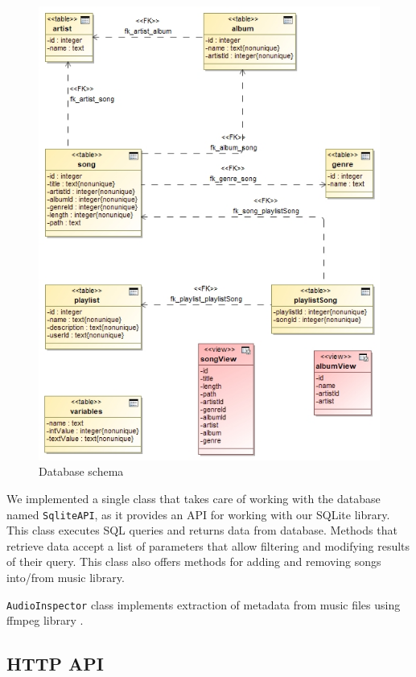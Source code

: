 \begin{figure}[ht]\centering
\includegraphics[width=1.0\textwidth]{img/DbDiagram2.png}
\caption{Database schema}
\label{fig03:dbSchema}
\end{figure}
\par
We implemented a single class that takes care of working with the database named \texttt{SqliteAPI}, as it provides an API for working with our SQLite library. This class executes SQL queries and returns data from database. Methods that retrieve data accept a list of parameters that allow filtering and modifying results of their query.
This class also offers methods for adding and removing songs into/from music library.
\par
\texttt{AudioInspector} class implements extraction of metadata from music files using ffmpeg library \citep{ffmpeg}.

\subsection{HTTP API}

